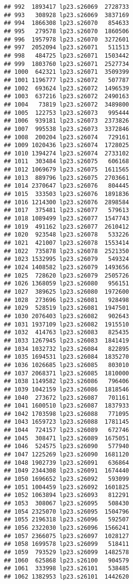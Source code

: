 \documentclass[
]{article}
\begin{document}
\begin{verbatim}
## 992  1893417 lp23.s26069  2728733
## 993   308928 lp23.s26069  3837169
## 994  1866308 lp23.s26070   854633
## 995   279578 lp23.s26070  1860506
## 996  1957978 lp23.s26070  3272601
## 997  2052094 lp23.s26071   511513
## 998   484725 lp23.s26071  1503442
## 999  1803760 lp23.s26071  2527734
## 1000  642321 lp23.s26071  3509399
## 1001 1196777 lp23.s26072   507787
## 1002  693624 lp23.s26072  1496539
## 1003  637216 lp23.s26072  2490163
## 1004   73819 lp23.s26072  3489800
## 1005  122753 lp23.s26073   995444
## 1006  939181 lp23.s26073  2373826
## 1007  995538 lp23.s26073  3372846
## 1008  200204 lp23.s26074   729161
## 1009 1020436 lp23.s26074  1728025
## 1010 1394274 lp23.s26074  2733102
## 1011  303484 lp23.s26075   606168
## 1012 1069679 lp23.s26075  1611565
## 1013  889796 lp23.s26075  2703661
## 1014 2370647 lp23.s26076   804445
## 1015  333503 lp23.s26076  1891836
## 1016 1214300 lp23.s26076  2898584
## 1017  375481 lp23.s26077   579613
## 1018 1089499 lp23.s26077  1547743
## 1019  491162 lp23.s26077  2610412
## 1020  923548 lp23.s26078   533226
## 1021  421007 lp23.s26078  1553414
## 1022  735878 lp23.s26078  2521350
## 1023 1532995 lp23.s26079   549324
## 1024 1408582 lp23.s26079  1493656
## 1025  728620 lp23.s26079  2505726
## 1026 1368059 lp23.s26080   956151
## 1027  389625 lp23.s26080  1972600
## 1028  273696 lp23.s26081   928498
## 1029  528519 lp23.s26081  1947501
## 1030 2076403 lp23.s26082   902643
## 1031 1937109 lp23.s26082  1915510
## 1032  414763 lp23.s26083   825435
## 1033 1267945 lp23.s26083  1841419
## 1034 1032732 lp23.s26084   822895
## 1035 1694531 lp23.s26084  1835270
## 1036 1026685 lp23.s26085   803010
## 1037 2068371 lp23.s26085  1810000
## 1038 1149582 lp23.s26086   796406
## 1039 1042159 lp23.s26086  1818546
## 1040  273672 lp23.s26087   701161
## 1041 1600510 lp23.s26087  1837933
## 1042 1703598 lp23.s26088   771095
## 1043 1659723 lp23.s26088  1781145
## 1044  724157 lp23.s26089   672746
## 1045  308471 lp23.s26089  1675051
## 1046  524575 lp23.s26090   577940
## 1047 1225269 lp23.s26090  1681120
## 1048 1902739 lp23.s26091   636864
## 1049 2344308 lp23.s26091  1674440
## 1050 1696652 lp23.s26092   593099
## 1051 1004459 lp23.s26092  1601825
## 1052 1063894 lp23.s26093   812291
## 1053  308067 lp23.s26095   508430
## 1054 2325070 lp23.s26095  1504796
## 1055 2196318 lp23.s26096   592507
## 1056 2322030 lp23.s26096  1566241
## 1057 2366075 lp23.s26097  1028127
## 1058 1699578 lp23.s26099   518411
## 1059  793529 lp23.s26099  1482578
## 1060  625868 lp23.s26100   904579
## 1061  333998 lp23.s26101   538485
## 1062 1382953 lp23.s26101  1442620

\end{verbatim}
\end{document}
